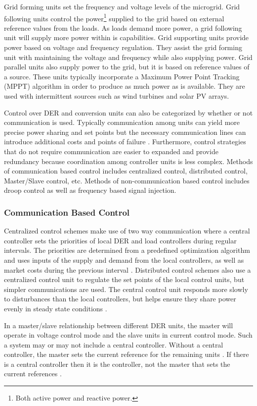 Grid forming units set the frequency and voltage levels of the microgrid. Grid following units control the power\footnote{Both active power and reactive power.} supplied to the grid based on external reference values from the loads. As loads demand more power, a grid following unit will supply more power within is capabilities. Grid supporting units provide power based on voltage and frequency regulation. They assist the grid forming unit with maintaining the voltage and frequency while also supplying power. Grid parallel units also supply power to the grid, but it is based on reference values of a source. These units typically incorporate a Maximum Power Point Tracking (MPPT) algorithm in order to produce as much power as is available. They are used with intermittent sources such as wind turbines and solar PV arrays. 

Control over DER and conversion units can also be categorized by whether or not communication is used. Typically communication among units can yield more precise power sharing and set points but the necessary communication lines can introduce additional costs and points of failure \cite{Vandoorn2013}. Furthermore, control strategies that do not require communication are easier to expanded and provide redundancy because coordination among controller units is less complex. Methods of communication based control includes centralized control, distributed control, Master/Slave control, etc. Methods of non-communication based control includes droop control as well as frequency based signal injection.

\subsubsection{Communication Based Control}
Centralized control schemes make use of two way communication where a central controller sets the priorities of local DER and load controllers during regular intervals. The priorities are determined from a predefined optimization algorithm and uses inputs of the supply and demand from the local controllers, as well as market costs during the previous interval \cite{Katiraei2008}. Distributed control schemes also use a centralized control unit to regulate the set points of the local control units, but simpler communications are used. The central control unit responds more slowly to disturbances than the local controllers, but helps ensure they share power evenly in steady state conditions \cite{Prodanovic2006}. 

In a master/slave relationship between different DER units, the master will operate in voltage control mode and the slave units in current control mode. Such a system may or may not include a central controller. Without a central controller, the master sets the current reference for the remaining units \cite{Siri1992}. If there is a central controller then it is the controller, not the master that sets the current references \cite{Chen1995}.


